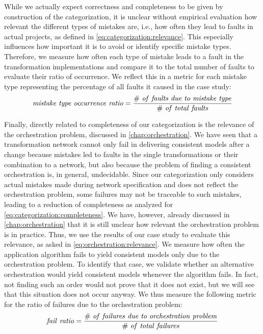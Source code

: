 While we actually expect correctness and completeness to be given by construction of the categorization, it is unclear without empirical evaluation how relevant the different types of mistakes are, i.e., how often they lead to faults in actual projects, as defined in \autoref{eq:categorization:relevance}.
This especially influences how important it is to avoid or identify specific mistake types.
Therefore, we measure how often each type of mistake leads to a fault in the transformation implementations and compare it to the total number of faults to evaluate their ratio of occurrence.
We reflect this in a metric for each mistake type representing the percentage of all faults it caused in the case study:
\begin{align*}
    \mathvariable{mistake\ type\ occurrence\ ratio} = \frac{\mathvariable{\#\ of\ faults\ due\ to\ mistake\ type}}{\mathvariable{\#\ of\ total\ faults}}
\end{align*}

Finally, directly related to completeness of our categorization is the relevance of the orchestration problem, discussed in \autoref{chap:orchestration}.
We have seen that a transformation network cannot only fail in delivering consistent models after a change because mistakes led to faults in the single transformations or their combination to a network, but also because the problem of finding a consistent orchestration is, in general, undecidable.
Since our categorization only considers actual mistakes made during network specification and does not reflect the orchestration problem, some failures may not be traceable to such mistakes, leading to a reduction of completeness as analyzed for \autoref{eq:categorization:completeness}.
We have, however, already discussed in \autoref{chap:orchestration} that it is still unclear how relevant the orchestration problem is in practice.
Thus, we use the results of our case study to evaluate this relevance, as asked in \autoref{eq:orchestration:relevance}.
We measure how often the application algorithm fails to yield consistent models only due to the orchestration problem.
To identify that case, we validate whether an alternative orchestration would yield consistent models whenever the algorithm fails.
In fact, not finding such an order would not prove that it does not exist, but we will see that this situation does not occur anyway.
We thus measure the following metric for the ratio of failures due to the orchestration problem:
\begin{align*}
    \mathvariable{fail\ ratio} = \frac{\mathvariable{\#\ of\ failures\ due\ to\ orchestration\ problem}}{\mathvariable{\#\ of\ total\ failures}}
\end{align*}


